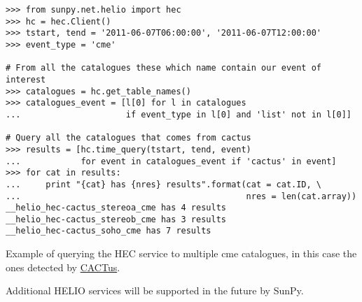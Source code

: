 \begin{listing}[h]
\begin{verbatim}
>>> from sunpy.net.helio import hec
>>> hc = hec.Client()
>>> tstart, tend = '2011-06-07T06:00:00', '2011-06-07T12:00:00'
>>> event_type = 'cme'

# From all the catalogues these which name contain our event of interest
>>> catalogues = hc.get_table_names()
>>> catalogues_event = [l[0] for l in catalogues 
...                     if event_type in l[0] and 'list' not in l[0]]

# Query all the catalogues that comes from cactus
>>> results = [hc.time_query(tstart, tend, event) 
...            for event in catalogues_event if 'cactus' in event]
>>> for cat in results:
...     print "{cat} has {nres} results".format(cat = cat.ID, \
...                                             nres = len(cat.array))
__helio_hec-cactus_stereoa_cme has 4 results
__helio_hec-cactus_stereob_cme has 3 results
__helio_hec-cactus_soho_cme has 7 results
\end{verbatim}
\caption{Example of querying the HEC service to multiple cme
catalogues, in this case the ones detected by \href{http://sidc.oma.be/cactus/}{CACTus}.}
\label{code:helio}
\end{listing}

Additional HELIO services will be supported in the future by SunPy.
